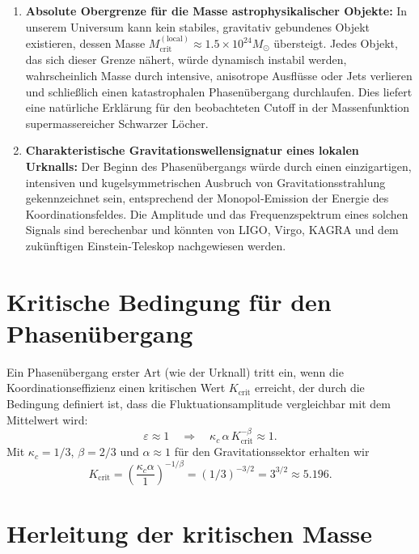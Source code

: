 \documentclass[11pt,a4paper]{article}
\newcommand{\kappac}{\kappa_c}
\newcommand{\betaf}{\beta}
\begin{document}
	\begin{enumerate}
		\item \textbf{Absolute Obergrenze für die Masse astrophysikalischer Objekte:} In unserem Universum kann kein stabiles, gravitativ gebundenes Objekt existieren, dessen Masse \(M_{\mathrm{crit}}^{\mathrm{(local)}} \approx 1.5 \times 10^{24} M_{\odot}\) übersteigt. Jedes Objekt, das sich dieser Grenze nähert, würde dynamisch instabil werden, wahrscheinlich Masse durch intensive, anisotrope Ausflüsse oder Jets verlieren und schließlich einen katastrophalen Phasenübergang durchlaufen. Dies liefert eine natürliche Erklärung für den beobachteten Cutoff in der Massenfunktion supermassereicher Schwarzer Löcher.
		
		\item \textbf{Charakteristische Gravitationswellensignatur eines lokalen Urknalls:} Der Beginn des Phasenübergangs würde durch einen einzigartigen, intensiven und kugelsymmetrischen Ausbruch von Gravitationsstrahlung gekennzeichnet sein, entsprechend der Monopol‑Emission der Energie des Koordinationsfeldes. Die Amplitude und das Frequenzspektrum eines solchen Signals sind berechenbar und könnten von LIGO, Virgo, KAGRA und dem zukünftigen Einstein‑Teleskop nachgewiesen werden.
	\end{enumerate}
	
	\section{Kritische Bedingung für den Phasenübergang}
	\label{sec:critical-condition}
	
	Ein Phasenübergang erster Art (wie der Urknall) tritt ein, wenn die Koordinationseffizienz einen kritischen Wert \(K_{\mathrm{crit}}\) erreicht, der durch die Bedingung definiert ist, dass die Fluktuationsamplitude vergleichbar mit dem Mittelwert wird:
	\begin{equation}
		\varepsilon \approx 1 \quad \Longrightarrow \quad \kappac \, \alpha \, K_{\mathrm{crit}}^{-\betaf} \approx 1.
		\label{eq:critical-condition}
	\end{equation}
	Mit \(\kappac = 1/3\), \(\betaf = 2/3\) und \(\alpha \approx 1\) für den Gravitationssektor erhalten wir
	\begin{equation}
		K_{\mathrm{crit}} = \left( \frac{\kappac \alpha}{1} \right)^{-1/\betaf} = (1/3)^{-3/2} = 3^{3/2} \approx 5.196.
		\label{eq:Kcrit}
	\end{equation}
	
	\section{Herleitung der kritischen Masse}
	\label{sec:derivation}
	
\end{document}
